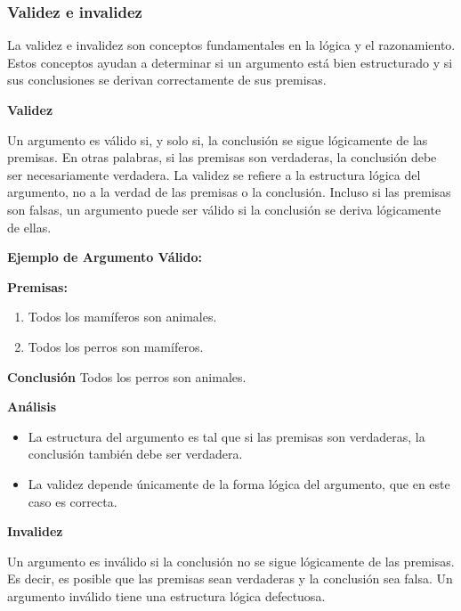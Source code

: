 \subsubsection{Validez e invalidez}

La validez e invalidez son conceptos fundamentales en la lógica y el razonamiento. Estos conceptos ayudan a determinar si un argumento está bien estructurado y si sus conclusiones se derivan correctamente de sus premisas.

\textbf{Validez}

Un argumento es válido si, y solo si, la conclusión se sigue lógicamente de las premisas. En otras palabras, si las premisas son verdaderas, la conclusión debe ser necesariamente verdadera. La validez se refiere a la estructura lógica del argumento, no a la verdad de las premisas o la conclusión. Incluso si las premisas son falsas, un argumento puede ser válido si la conclusión se deriva lógicamente de ellas.

\textbf{Ejemplo de Argumento Válido:}

\textbf{Premisas:}
\begin{enumerate}
   \item Todos los mamíferos son animales.
   \item Todos los perros son mamíferos.
\end{enumerate}

\textbf{Conclusión}
Todos los perros son animales.

\textbf{Análisis}

\begin{itemize}
   \item La estructura del argumento es tal que si las premisas son verdaderas, la conclusión también debe ser verdadera.
   \item La validez depende únicamente de la forma lógica del argumento, que en este caso es correcta.
\end{itemize}

\textbf{Invalidez}

Un argumento es inválido si la conclusión no se sigue lógicamente de las premisas. Es decir, es posible que las premisas sean verdaderas y la conclusión sea falsa. Un argumento inválido tiene una estructura lógica defectuosa.

